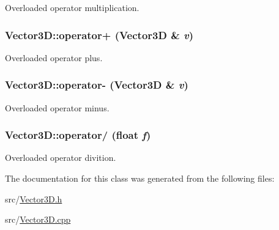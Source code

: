 \label{classVector3D_a5a36ff390f5954f79687a3921e031553}
Overloaded operator multiplication. \hypertarget{classVector3D_aee27c6e25d5975d5ae9cf2066359e656}{
\subsubsection[{operator+}]{ Vector3D::operator+ ({\bf Vector3D} \& {\em v})}}
\label{classVector3D_aee27c6e25d5975d5ae9cf2066359e656}
Overloaded operator plus. \hypertarget{classVector3D_a150eaa071600434aa7a6128218128e59}{
\subsubsection[{operator-\/}]{ Vector3D::operator-\/ ({\bf Vector3D} \& {\em v})}}
\label{classVector3D_a150eaa071600434aa7a6128218128e59}
Overloaded operator minus. \hypertarget{classVector3D_ac0335249709d2e203c2871c7310aa475}{
\subsubsection[{operator/}]{ Vector3D::operator/ (float {\em f})}}
\label{classVector3D_ac0335249709d2e203c2871c7310aa475}
Overloaded operator divition. 

The documentation for this class was generated from the following files:\begin{DoxyCompactItemize}
\item 
src/\hyperlink{Vector3D_8h}{Vector3D.h}\item 
src/\hyperlink{Vector3D_8cpp}{Vector3D.cpp}\end{DoxyCompactItemize}
